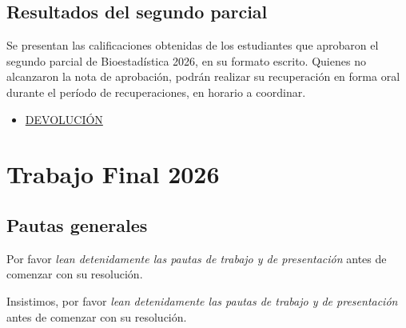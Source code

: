 \documentclass[
  spanish,
  letterpaper,
  DIV=11,
  numbers=noendperiod]{scrreprt}
\providecommand{\tightlist}{%
  \setlength{\itemsep}{0pt}\setlength{\parskip}{0pt}}
\begin{document}
\section*{Resultados del segundo
parcial}\label{resultados-del-segundo-parcial}


Se presentan las calificaciones obtenidas de los estudiantes que
aprobaron el segundo parcial de Bioestadística 2026, en su formato
escrito. Quienes no alcanzaron la nota de aprobación, podrán realizar su
recuperación en forma oral durante el período de recuperaciones, en
horario a coordinar.

\begin{itemize}
\tightlist
\item
  \href{./SEGUNDO\%20PARCIAL/DEVOLUCIONES_SEGUNDO_PARCIAL_2026.txt}{DEVOLUCIÓN}
\end{itemize}


\chapter*{Trabajo Final \textbar{} 2026}\label{trabajo-final-2026}


\section*{Pautas generales}\label{pautas-generales}


Por favor \emph{lean detenidamente las pautas de trabajo y de
presentación} antes de comenzar con su resolución.

Insistimos, por favor \emph{lean detenidamente las pautas de trabajo y
de presentación} antes de comenzar con su resolución.
\end{document}
